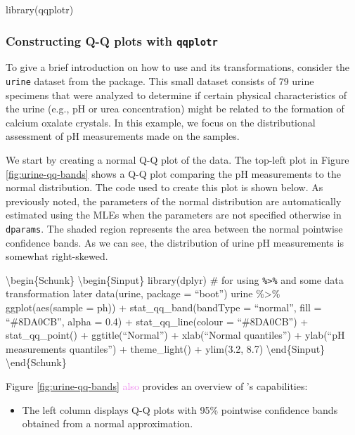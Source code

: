 \begin{Schunk}
\begin{Sinput}
library(qqplotr)
\end{Sinput}
\end{Schunk}

\hypertarget{constructing-q-q-plots-with-qqplotr}{%
\subsubsection{\texorpdfstring{Constructing Q-Q plots with
\texttt{qqplotr}}{Constructing Q-Q plots with qqplotr}}\label{constructing-q-q-plots-with-qqplotr}}

To give a brief introduction on how to use  and its
transformations, consider the \texttt{urine} dataset from the 
package. This small dataset consists of 79 urine specimens that were
analyzed to determine if certain physical characteristics of the urine
(e.g., pH or urea concentration) might be related to the formation of
calcium oxalate crystals. In this example, we focus on the
distributional assessment of pH measurements made on the samples.

We start by creating a normal Q-Q plot of the data. The top-left plot in
Figure \ref{fig:urine-qq-bands} shows a Q-Q plot comparing the pH
measurements to the normal distribution. The code used to create this
plot is shown below. As previously noted, the parameters of the normal
distribution are automatically estimated using the MLEs when the
parameters are not specified otherwise in \texttt{dparams}. The shaded
region represents the area between the normal pointwise confidence
bands. As we can see, the distribution of urine pH measurements is
somewhat right-skewed.

\textbackslash{}begin\{Schunk\} \textbackslash{}begin\{Sinput\}
library(dplyr) \# for using \texttt{\%\textgreater{}\%} and some data
transformation later data(urine, package = ``boot'') urine
\%\textgreater{}\% ggplot(aes(sample = ph)) + stat\_qq\_band(bandType =
``normal'', fill = ``\#8DA0CB'', alpha = 0.4) + stat\_qq\_line(colour =
``\#8DA0CB'') + stat\_qq\_point() + ggtitle(``Normal'') + xlab(``Normal
quantiles'') + ylab(``pH measurements quantiles'') + theme\_light() +
ylim(3.2, 8.7) \textbackslash{}end\{Sinput\}
\textbackslash{}end\{Schunk\}

Figure \ref{fig:urine-qq-bands} {\textcolor{violet}{also}} provides an
overview of 's capabilities:

\begin{itemize}
\tightlist
\item
  The left column displays Q-Q plots with 95\% pointwise confidence
  bands obtained from a normal approximation.
\end{itemize}


